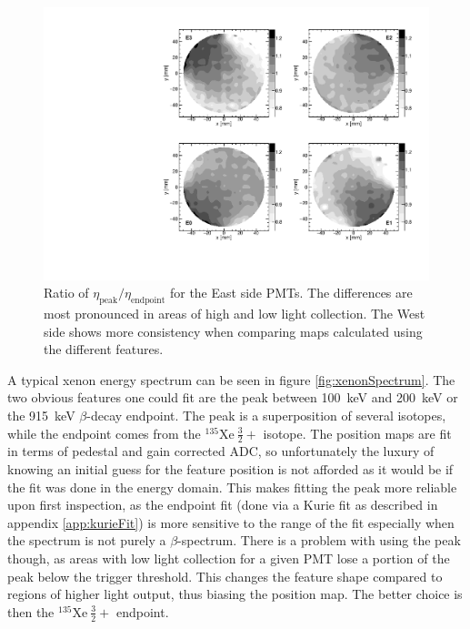 \begin{figure}[h] 
\centering
\includegraphics[scale=.55]{3-UCNAAnalysis/posmapComp_4_5mm_endpoint_vs_peak.pdf}
\caption{Ratio of $\eta_{\mathrm{peak}} / \eta_{\mathrm{endpoint}}$ for the East side PMTs. The differences
  are most pronounced in areas of high and low light collection. The West side shows more
  consistency when comparing maps calculated using the different features.}
\label{fig:posmapCompare}
\end{figure}

A typical xenon energy spectrum can be seen in figure \ref{fig:xenonSpectrum}. The two obvious features one could
fit are the peak between 100~keV and 200~keV or the 915~keV $\beta$-decay endpoint. The peak is a
superposition of several isotopes, while the endpoint comes from the
$^{135}\mathrm{Xe~}\frac{3}{2}+$ isotope. The position maps are fit in terms of pedestal and gain corrected ADC,
so unfortunately the luxury of knowing an initial guess for the feature position is not afforded as it would
be if the fit was done in the energy domain. This makes
fitting the peak more reliable upon first inspection, as the endpoint fit (done via a Kurie fit as described
in appendix \ref{app:kurieFit}) is more sensitive to the range of the fit especially when the spectrum is not
purely a $\beta$-spectrum. There is a problem with using the peak though, as areas with low light collection
for a given PMT lose a portion of the peak below the trigger threshold. This changes the feature shape
compared to regions of higher light output, thus biasing the position map. The better choice is then the
$^{135}\mathrm{Xe~}\frac{3}{2}+$ endpoint. 

